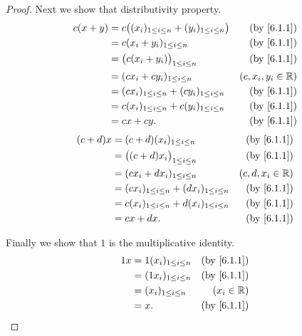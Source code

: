 \begin{proof}
  Next we show that distributivity property.
  \begin{align*}
    c(x + y) & = c\big((x_i)_{1 \leq i \leq n} + (y_i)_{1 \leq i \leq n}\big) & \text{(by \cref{6.1.1})} \\
             & = c(x_i + y_i)_{1 \leq i \leq n}                               & \text{(by \cref{6.1.1})} \\
             & = \big(c(x_i + y_i)\big)_{1 \leq i \leq n}                     & \text{(by \cref{6.1.1})} \\
             & = (c x_i + c y_i)_{1 \leq i \leq n}                            & (c, x_i, y_i \in \R)     \\
             & = (c x_i)_{1 \leq i \leq n} + (c y_i)_{1 \leq i \leq n}        & \text{(by \cref{6.1.1})} \\
             & = c(x_i)_{1 \leq i \leq n} + c(y_i)_{1 \leq i \leq n}          & \text{(by \cref{6.1.1})} \\
             & = cx + cy.                                                     & \text{(by \cref{6.1.1})}
  \end{align*}
  \begin{align*}
    (c + d)x & = (c + d)(x_i)_{1 \leq i \leq n}                        & \text{(by \cref{6.1.1})} \\
             & = \big((c + d) x_i\big)_{1 \leq i \leq n}               & \text{(by \cref{6.1.1})} \\
             & = (c x_i + d x_i)_{1 \leq i \leq n}                     & (c, d, x_i \in \R)       \\
             & = (c x_i)_{1 \leq i \leq n} + (d x_i)_{1 \leq i \leq n} & \text{(by \cref{6.1.1})} \\
             & = c(x_i)_{1 \leq i \leq n} + d(x_i)_{1 \leq i \leq n}   & \text{(by \cref{6.1.1})} \\
             & = cx + dx.                                              & \text{(by \cref{6.1.1})}
  \end{align*}

  Finally we show that \(1\) is the multiplicative identity.
  \begin{align*}
    1 x & = 1 (x_i)_{1 \leq i \leq n} & \text{(by \cref{6.1.1})} \\
        & = (1 x_i)_{1 \leq i \leq n} & \text{(by \cref{6.1.1})} \\
        & = (x_i)_{1 \leq i \leq n}   & (x_i \in \R)             \\
        & = x.                        & \text{(by \cref{6.1.1})}
  \end{align*}
\end{proof}


